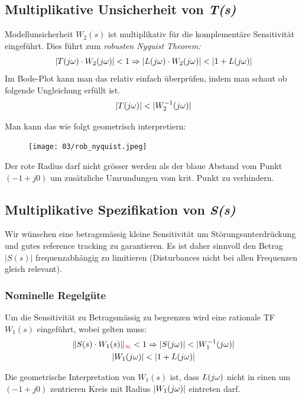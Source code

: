 \subsection{Multiplikative Unsicherheit von \textit{T(s)}}
    Modellunsicherheit $W_2(s)$ ist multiplikativ für die komplementäre Sensitivität eingeführt. Dies führt zum \textit{robusten Nyquist Theorem:}
    \begin{equation*}
        |T(j\omega)\cdot W_2(j\omega)| < 1 \Rightarrow |L(j\omega)\cdot W_2(j\omega)| < |1+L(j\omega)|
    \end{equation*}
    Im Bode-Plot kann man das relativ einfach überprüfen, indem man schaut ob folgende Ungleichung erfüllt ist.
    \begin{equation*}
        |T(j\omega)| <  |W_2^{-1}(j\omega)|
    \end{equation*}
    
    Man kann das wie folgt geometrisch interpretiern:
    \begin{figure}[H]
        \centering
        \texttt{[image: 03/rob\_nyquist.jpeg]}
    \end{figure}
    
    Der rote Radius darf nicht grösser werden als der blaue Abstand vom Punkt $(-1 + j0)$ um zusätzliche Umrundungen vom krit. Punkt zu verhindern.
    
\subsection{Multiplikative Spezifikation von \textit{S(s)}}
    Wir wünschen eine betragsmässig kleine Sensitivität um Störungsunterdrückung und gutes reference tracking zu garantieren. Es ist daher sinnvoll den Betrag $|S(s)|$ frequenzabhängig zu limitieren (Disturbances nicht bei allen Frequenzen gleich relevant).
    
    \subsubsection{Nominelle Regelgüte}
        Um die Sensitivität zu Betragsmässig zu begrenzen wird eine rationale TF $W_1(s)$ eingeführt, wobei gelten muss:
        \begin{gather*}
            \| S(s)\cdot W_1(s)\|_{\textcolor{red}{\infty}} < 1 \Rightarrow |S(j\omega)| < |W_1^{-1}(j\omega)|\\
            |W_1(j\omega)| < |1 + L(j\omega)|
        \end{gather*}
        
        Die geometrische Interpretation von $W_1(s)$ ist, dass $L(j\omega)$ nicht in einen um $(-1 + j0)$ zentrieren Kreis mit Radius $|W_1(j\omega)|$ eintreten darf.
    
